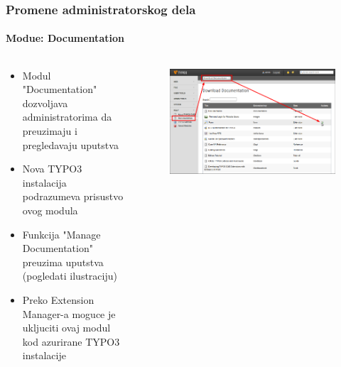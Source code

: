 \begin{frame}[fragile]
	\frametitle{Promene administratorskog dela}
	\framesubtitle{Modue: Documentation}

	\begin{columns}[T]

		\begin{column}{.5\textwidth}
			\begin{itemize}
				\item Modul "Documentation" dozvoljava administratorima da preuzimaju i pregledavaju uputstva
				\item Nova TYPO3 instalacija podrazumeva prisustvo ovog modula
				\item Funkcija "Manage Documentation" preuzima uputstva (pogledati ilustraciju)
				\item Preko Extension Manager-a moguce je ukljuciti ovaj modul kod azurirane TYPO3 instalacije
			\end{itemize}
		\end{column}

		\begin{column}{.5\textwidth}
			\begin{figure}\vspace*{-0.4cm}
				\includegraphics[width=1\linewidth]{Images/BackendChanges/DownloadDocumentation.png}
			\end{figure}
		\end{column}

	\end{columns}

\end{frame}


